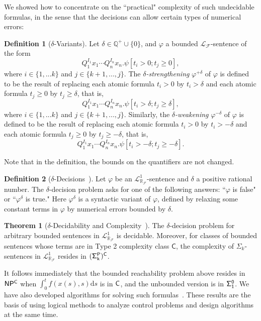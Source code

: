\documentclass[10pt]{article}
\newcommand{\lrf}{\mathcal{L}_{\mathbb{R}_{\mathcal{F}}}}
\theoremstyle{definition}
\newtheorem{definition}{Definition}[section]
\newtheorem{theorem}{Theorem}[section]
\begin{document}
We showed how to concentrate on the ``practical" complexity of such undecidable formulas, in the sense that the decisions can allow certain types of numerical errors:

\begin{definition}[$\delta$-Variants]
Let $\delta\in \mathbb{Q}^+\cup\{0\}$, and $\varphi$ a bounded $\mathcal{L}_{\mathcal{F}}$-sentence of the form
$$Q_1^{I_1}x_1\cdots Q_n^{I_n}x_n.\psi[t_i>0; t_j\geq 0],$$
where $i\in\{1,...k\}$ and $j\in\{k+1,...,j\}$. The {\em $\delta$-strengthening} $\varphi^{+\delta}$ of $\varphi$ is defined to be the result of replacing each atomic formula $t_i > 0$ by $t_i > \delta$ and each atomic formula $t_j \geq 0$ by $t_j \geq \delta$, that is,
$$Q_1^{I_1}x_1\cdots Q_n^{I_n}x_n.\psi[t_i>\delta; t_j\geq \delta],$$
where $i\in\{1,...k\}$ and $j\in\{k+1,...,j\}$.
Similarly, the {\em $\delta$-weakening} $\varphi^{-\delta}$ of $\varphi$ is defined to be the result of replacing each atomic formula $t_i > 0$ by $t_i > -\delta$ and each atomic formula $t_j \geq 0$ by $t_j \geq -\delta$, that is,
$$Q_1^{I_1}x_1\cdots Q_n^{I_n}x_n.\psi[t_i>-\delta; t_j\geq -\delta].$$
\end{definition}
Note that in the definition, the bounds on the quantifiers are not changed. 
\begin{definition}[$\delta$-Decisions~\cite{DBLP:conf/lics/GaoAC12}] Let $\varphi$ be an $\lrf^1$-sentence and $\delta$ a positive rational number. The $\delta$-decision problem asks for one of the following answers: ``$\varphi$ is false" or ``$\varphi^{\delta}$ is true." Here $\varphi^{\delta}$ is a syntactic variant of $\varphi$, defined by relaxing some constant terms in $\varphi$ by numerical errors bounded by $\delta$. 
\end{definition}
\begin{theorem}[$\delta$-Decidability and Complexity~\cite{DBLP:conf/lics/GaoAC12}] The $\delta$-decision problem for arbitrary bounded sentences in $\lrf^1$ is decidable. Moreover, for classes of bounded sentences whose terms are in Type 2 complexity class $\mathsf{C}$, the complexity of $\Sigma_k$-sentences in $\lrf^1$ resides in ${\sf (\Sigma^P_k)^C}$. 
\end{theorem}
It follows immediately that the bounded reachability problem above resides in ${\sf NP^C}$ when $\int_{0}^t f(x(s),s)\mathrm{d}s$ is in ${\sf C}$, and the unbounded version is in ${\sf \Sigma^0_1}$. We have also developed algorithms for solving such formulas~\cite{DBLP:conf/fmcad/GaoKC13}. These results are the basis of using logical methods to analyze control problems and design algorithms at the same time. 
\end{document}

